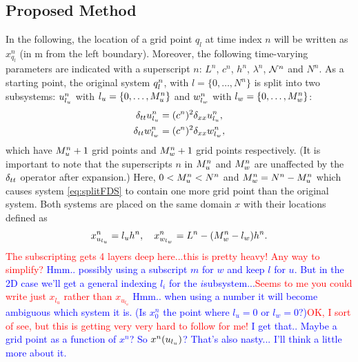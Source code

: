 \documentclass[fleqn]{jaes}
\def\SBcomment[#1]{\textcolor{red}{#1}}
\def\SWcomment[#1]{\textcolor{blue}{#1}}
\begin{document}
\subsection{Proposed Method}
In the following, the location of a grid point $q_l$ at time index $n$ will be written as $x_{q_l}^n$ (in m from the left boundary). Moreover, the following time-varying parameters are indicated with a superscript $n$: $L^n$, $c^n$, $h^n$, $\lambda^n$, $\mathcal{N}^n$ and $N^n$. %
As a starting point, the original system $q_l^n$, with $l=\{0, \hdots, N^n\}$ is split into two subsystems: $u_{l_u}^n$ with $l_u=\{0, \hdots, M_u^n\}$ and $w_{l_w}^n$ with  $l_w=\{0, \hdots, M_w^n\}$:
\begin{subequations}\label{eq:splitFDS}
    \begin{align}
        \delta_{tt} u_{l_u}^n &= (c^n)^2\delta_{xx} u_{l_u}^n,\\
        \delta_{tt} w_{l_w}^n &= (c^n)^2\delta_{xx} w_{l_w}^n,
    \end{align}
\end{subequations}
which have $M_u^n+1$ grid points and $M_w^n+1$ grid points respectively. (It is important to note that the superscripts $n$ in $M_u^n$ and $M_w^n$ are unaffected by the $\delta_{tt}$ operator after expansion.) Here, $0<M_u^n<N^n$ and $M_w^n = N^n - M_u^n$ which causes system \eqref{eq:splitFDS} to contain one more grid point than the original system. Both systems are placed on the same domain $x$ with their locations defined as
\begin{equation}\label{eq:gridLocations}
    x_{u_\lu}^n =\lu h^n, \quad x_{w_\lw}^n = L^n-(\Mw-\lw)h^n.
\end{equation}
\SBcomment[The subscripting gets 4 layers deep here...this is pretty heavy! Any way to simplify?] \SWcomment[Hmm.. possibly using a subscript $m$ for $w$ and keep $l$ for $u$. But in the 2D case we'll get a general indexing $l_i$ for the $i$\th subsystem...]\SBcomment[Seems to me you could write just $x_{l_{u}}$ rather than $x_{u_{l_{u}}}$] \SWcomment[Hmm.. when using a number it will become ambiguous which system it is. (Is $x_0^n$ the point where $l_u = 0$ or $l_w = 0$?)]\SBcomment[OK, I sort of see, but this is getting very very hard to follow for me!] \SWcomment[I get that.. Maybe a grid point as a function of $x^n$? So $x^n(u_{l_u})$? That's also nasty... I'll think a little more about it.]
\end{document}
